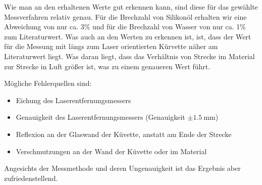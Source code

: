  Wie man an den erhaltenen Werte gut erkennen kann, sind diese für das gewählte Messverfahren relativ genau. Für die Brechzahl von Silikonöl erhalten wir eine Abweichung von nur ca. 3\% und für die Brechzahl von Wasser von nur ca. 1\% zum Literaturwert. Was auch an den Werten zu erkennen ist, ist, dass der Wert für die Messung mit längs zum Laser orientierten Kürvette näher am Literaturwert liegt. Was daran liegt, dass das Verhältnis von Strecke im Material zur Strecke in Luft größer ist, was zu einem genaueren Wert führt.
 
 Mögliche Fehlerquellen sind: 
 
 \begin{itemize}
     \item Eichung des Laserentfernungsmessers
     \item Genauigkeit des Laserentfernungsmessers (Genauigkeit $\pm \SI{1.5}{\milli\metre}$)
     \item Reflexion an der Glaswand der Küvette, anstatt am Ende der Strecke
     \item Verschmutzungen an der Wand der Küvette oder im Material
 \end{itemize}
 
 Angesichts der Messmethode und deren Ungenauigkeit ist das Ergebnis aber zufriedenstellend.